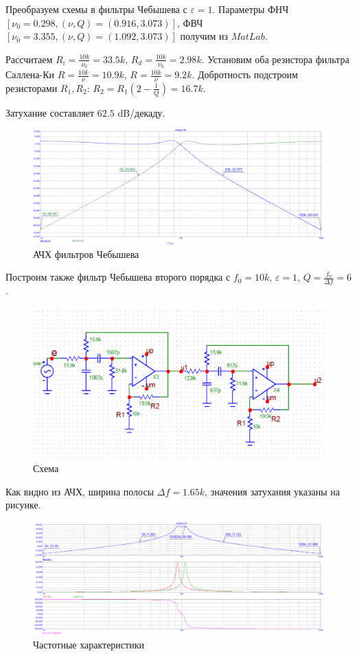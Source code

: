 \documentclass[12pt,a4paper]{article}
\begin{document}
	Преобразуем схемы в фильтры Чебышева с $\varepsilon = 1$. Параметры ФНЧ $[\nu_0 = 0.298, (\nu, Q) = (0.916, 3.073)]$, ФВЧ $[\nu_0 = 3.355, (\nu, Q) = (1.092, 3.073)]$ получим из $MatLab$.
	
	Рассчитаем $R_i = \frac{10k}{\nu_0} = 33.5k$, $R_d = \frac{10k}{\nu_0} = 2.98k$.
	Установим оба резистора фильтра Саллена-Ки $R = \frac{10k}{\nu} = 10.9k$, $R = \frac{10k}{\nu} = 9.2k$. Добротность подстроим резисторами $R_1, R_2$: $R_2 = R_1 (2 - \frac{1}{Q}) = 16.7k$.

	Затухание составляет $62.5$ dB/декаду.
	\begin{figure}[H]
		\centering
		\includegraphics[width=1.0\linewidth]{res/sk3pole_cheb.png}
		\caption{АЧХ фильтров Чебышева}
		\label{scheme}
	\end{figure}

	Построим также фильтр Чебышева второго порядка с $f_0 = 10k$, $\varepsilon = 1$, $Q = \frac{f_0}{\Delta f} = 6$.
	
	\begin{figure}[H]
		\centering
		\includegraphics[width=1.0\linewidth]{res/sk4pole_scheme.png}
		\caption{Схема}
		\label{scheme}
	\end{figure}
	
	Как видно из АЧХ, ширина полосы $\Delta f = 1.65k$, значения затухания указаны на рисунке.
	\begin{figure}[H]
		\centering
		\includegraphics[width=1.0\linewidth]{res/sk4pole.png}
		\caption{Частотные характеристики}
		\label{scheme}
	\end{figure}
	
\end{document}
